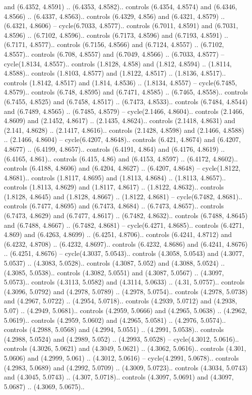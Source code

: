 and (6.4352, 4.8591) .. (6.4353, 4.8582).. controls (6.4354, 4.8574) and (6.4346, 4.8566) .. (6.4337, 4.8563).. controls (6.4329, 4.856) and (6.4321, 4.8579) .. (6.4321, 4.8606) -- cycle(6.7033, 4.8577).. controls (6.7011, 4.8591) and (6.7031, 4.8596) .. (6.7102, 4.8596).. controls (6.7173, 4.8596) and (6.7193, 4.8591) .. (6.7171, 4.8577).. controls (6.7156, 4.8566) and (6.7124, 4.8557) .. (6.7102, 4.8557).. controls (6.708, 4.8557) and (6.7049, 4.8566) .. (6.7033, 4.8577) -- cycle(1.8134, 4.8557).. controls (1.8128, 4.858) and (1.812, 4.8594) .. (1.8114, 4.8588).. controls (1.8103, 4.8577) and (1.8122, 4.8517) .. (1.8136, 4.8517).. controls (1.8142, 4.8517) and (1.814, 4.8536) .. (1.8134, 4.8557) -- cycle(6.7485, 4.8579).. controls (6.748, 4.8595) and (6.7471, 4.8585) .. (6.7465, 4.8558).. controls (6.7455, 4.8525) and (6.7458, 4.8517) .. (6.7473, 4.8533).. controls (6.7484, 4.8544) and (6.7489, 4.8565) .. (6.7485, 4.8579) -- cycle(2.1466, 4.8604).. controls (2.1466, 4.8609) and (2.1452, 4.8617) .. (2.1435, 4.8624).. controls (2.1418, 4.8631) and (2.141, 4.8628) .. (2.1417, 4.8616).. controls (2.1428, 4.8598) and (2.1466, 4.8588) .. (2.1466, 4.8604) -- cycle(6.4207, 4.8648).. controls (6.421, 4.8674) and (6.4207, 4.8677) .. (6.4199, 4.8657).. controls (6.4191, 4.864) and (6.4176, 4.8619) .. (6.4165, 4.861).. controls (6.415, 4.86) and (6.4153, 4.8597) .. (6.4172, 4.8602).. controls (6.4188, 4.8606) and (6.4204, 4.8627) .. (6.4207, 4.8648) -- cycle(1.8122, 4.8681).. controls (1.8117, 4.8695) and (1.8113, 4.8684) .. (1.8113, 4.8657).. controls (1.8113, 4.8629) and (1.8117, 4.8617) .. (1.8122, 4.8632).. controls (1.8128, 4.8645) and (1.8128, 4.8667) .. (1.8122, 4.8681) -- cycle(6.7482, 4.8681).. controls (6.7477, 4.8695) and (6.7473, 4.8684) .. (6.7473, 4.8657).. controls (6.7473, 4.8629) and (6.7477, 4.8617) .. (6.7482, 4.8632).. controls (6.7488, 4.8645) and (6.7488, 4.8667) .. (6.7482, 4.8681) -- cycle(6.4271, 4.8685).. controls (6.4271, 4.869) and (6.4263, 4.8699) .. (6.4251, 4.8706).. controls (6.4241, 4.8712) and (6.4232, 4.8708) .. (6.4232, 4.8697).. controls (6.4232, 4.8686) and (6.4241, 4.8676) .. (6.4251, 4.8676) -- cycle(4.3037, 5.0543).. controls (4.3058, 5.0543) and (4.3077, 5.0537) .. (4.3083, 5.0528).. controls (4.3087, 5.052) and (4.3088, 5.0524) .. (4.3085, 5.0538).. controls (4.3082, 5.0551) and (4.3087, 5.0567) .. (4.3097, 5.0573).. controls (4.3113, 5.0582) and (4.3114, 5.0633) .. (4.31, 5.0757).. controls (4.3096, 5.0792) and (4.2978, 5.0789) .. (4.2978, 5.0754).. controls (4.2978, 5.0738) and (4.2967, 5.0722) .. (4.2954, 5.0718).. controls (4.2939, 5.0712) and (4.2938, 5.07) .. (4.2949, 5.0681).. controls (4.2959, 5.0666) and (4.2965, 5.0638) .. (4.2962, 5.0619).. controls (4.2959, 5.0602) and (4.2965, 5.0581) .. (4.2976, 5.0574).. controls (4.2988, 5.0568) and (4.2994, 5.0551) .. (4.2991, 5.0538).. controls (4.2988, 5.0524) and (4.2989, 5.052) .. (4.2993, 5.0528) -- cycle(4.3012, 5.0616).. controls (4.3026, 5.0621) and (4.3049, 5.0621) .. (4.3062, 5.0616).. controls (4.301, 5.0606) and (4.2999, 5.061) .. (4.3012, 5.0616) -- cycle(4.2991, 5.0678).. controls (4.2983, 5.0689) and (4.2992, 5.0709) .. (4.3009, 5.0723).. controls (4.3034, 5.0743) and (4.3045, 5.0743) .. (4.307, 5.0718).. controls (4.3097, 5.0691) and (4.3097, 5.0687) .. (4.3069, 5.0675).. 